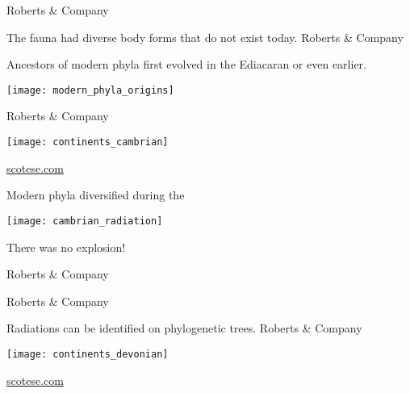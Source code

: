 \documentclass[t]{beamer}
\begin{document}
{
\begin{frame}[b]
\hfill \tiny \textcopyright Roberts \& Company
\end{frame}
}
%
{
\begin{frame}[b]{The fauna had diverse body forms that do not exist today.}
\hfill \tiny \textcopyright Roberts \& Company
\end{frame}
}
%
\begin{frame}{Ancestors of modern phyla first evolved in the Ediacaran or even earlier. }

	\texttt{[image: modern\_phyla\_origins]}

	\vfilll
	
	\hfill \tiny \textcopyright Roberts \& Company

\end{frame}
%
{
\begin{frame}[t]
	\texttt{[image: continents\_cambrian]}
	
	\vfilll
	
	\hfill \tiny \textcolor{white}{\href{http://scotese.com}{scotese.com}}
\end{frame}
}
%

\begin{frame}{Modern phyla diversified during the  }

	\texttt{[image: cambrian\_radiation]}
	
	\hangpara There was no explosion!

	\vfilll
	
	\hfill \tiny \textcopyright Roberts \& Company

\end{frame}
%
{
\begin{frame}[b]
\hfill \tiny \textcopyright Roberts \& Company
\end{frame}
}
%
{
\begin{frame}[b]{Radiations can be identified on phylogenetic trees.}
\hfill \tiny \textcopyright Roberts \& Company
\end{frame}
}
%
{
\begin{frame}[t]
	\texttt{[image: continents\_devonian]}
	
	\vfilll
	
	\hfill \tiny \textcolor{white}{\href{http://scotese.com}{scotese.com}}
\end{frame}
}
%
\end{document}
